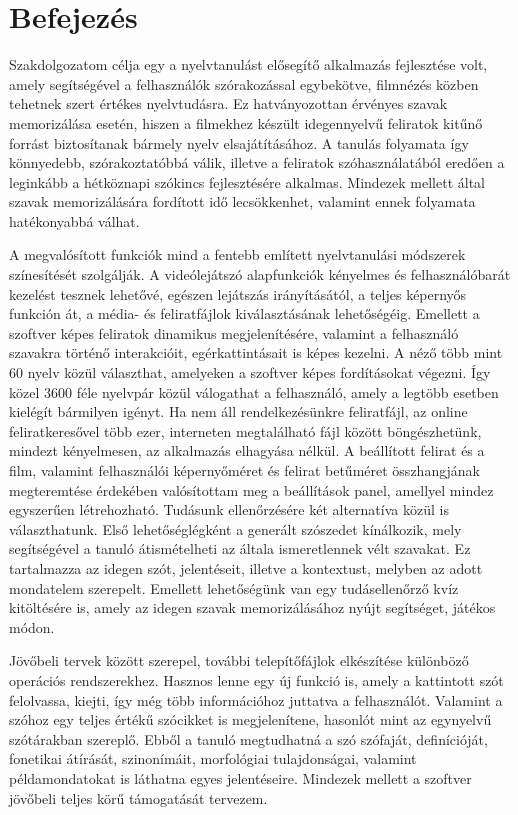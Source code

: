 \chapter*{Befejezés}

Szakdolgozatom célja egy a nyelvtanulást elősegítő alkalmazás fejlesztése volt, amely segítségével a felhasználók szórakozással egybekötve, filmnézés közben tehetnek szert értékes nyelvtudásra. Ez hatványozottan érvényes szavak memorizálása esetén, hiszen a filmekhez készült idegennyelvű feliratok kitűnő forrást biztosítanak bármely nyelv elsajátításához. A tanulás folyamata így könnyedebb, szórakoztatóbbá válik, illetve a feliratok szóhasználatából eredően a leginkább a hétköznapi szókincs fejlesztésére alkalmas. Mindezek mellett által szavak memorizálására fordított idő lecsökkenhet, valamint ennek folyamata hatékonyabbá válhat. 

A megvalósított funkciók mind a fentebb említett nyelvtanulási módszerek színesítését szolgálják. A videólejátszó alapfunkciók kényelmes és felhasználóbarát kezelést tesznek lehetővé, egészen lejátszás irányításától, a teljes képernyős funkción át, a média- és feliratfájlok kiválasztásának lehetőségéig. Emellett a szoftver képes feliratok dinamikus megjelenítésére, valamint a felhasználó szavakra történő interakcióit, egérkattintásait is képes kezelni. A néző több mint 60 nyelv közül választhat, amelyeken a szoftver képes fordításokat végezni. Így közel 3600 féle nyelvpár közül válogathat a felhasználó, amely a legtöbb esetben kielégít bármilyen igényt. Ha nem áll rendelkezésünkre feliratfájl, az online feliratkeresővel több ezer, interneten megtalálható fájl között böngészhetünk, mindezt kényelmesen, az alkalmazás elhagyása nélkül. A beállított felirat és a film, valamint felhasználói képernyőméret és felirat betűméret összhangjának megteremtése érdekében valósítottam meg a beállítások panel, amellyel mindez egyszerűen létrehozható. Tudásunk ellenőrzésére két alternatíva közül is választhatunk. Első lehetőséglégként a generált szószedet kínálkozik, mely segítségével a tanuló átismételheti az általa ismeretlennek vélt szavakat. Ez tartalmazza az idegen szót, jelentéseit, illetve a kontextust, melyben az adott mondatelem szerepelt. Emellett lehetőségünk van egy tudásellenőrző kvíz kitöltésére is, amely az idegen szavak memorizálásához nyújt segítséget, játékos módon.

Jövőbeli tervek között szerepel, további telepítőfájlok elkészítése különböző operációs rendszerekhez. Hasznos lenne egy új funkció is, amely a kattintott szót felolvassa, kiejti, így még több információhoz juttatva a felhasználót. Valamint a szóhoz egy teljes értékű szócikket is megjelenítene, hasonlót mint az egynyelvű szótárakban szereplő. Ebből a tanuló megtudhatná a szó szófaját, definícióját, fonetikai átírását, szinonímáit, morfológiai tulajdonságai, valamint példamondatokat is láthatna egyes jelentéseire. Mindezek mellett a szoftver jövőbeli teljes körű támogatását tervezem.